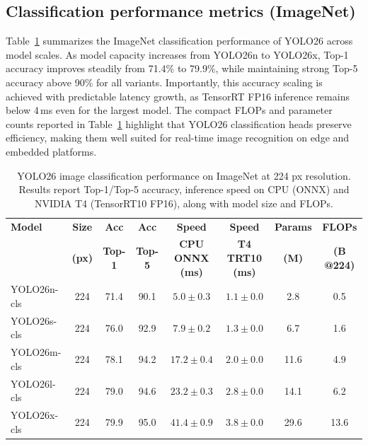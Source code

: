 \documentclass{article}
\begin{document}
\subsection{Classification performance metrics (ImageNet)}

Table~\ref{tab:yolo26_classification} summarizes the ImageNet classification performance of YOLO26 across model scales. As model capacity increases from YOLO26n to YOLO26x, Top-1 accuracy improves steadily from 71.4\% to 79.9\%, while maintaining strong Top-5 accuracy above 90\% for all variants. Importantly, this accuracy scaling is achieved with predictable latency growth, as TensorRT FP16 inference remains below 4\,ms even for the largest model. The compact FLOPs and parameter counts reported in Table~\ref{tab:yolo26_classification} highlight that YOLO26 classification heads preserve efficiency, making them well suited for real-time image recognition on edge and embedded platforms.

\begin{table}[t]
\centering
\scriptsize
\setlength{\tabcolsep}{4pt}
\renewcommand{\arraystretch}{1.15}
\caption{YOLO26 image classification performance on ImageNet at 224 px resolution. Results report Top-1/Top-5 accuracy, inference speed on CPU (ONNX) and NVIDIA T4 (TensorRT10 FP16), along with model size and FLOPs.}
\label{tab:yolo26_classification}
\vspace{2pt}

\begin{tabular}{l c c c c c c c}
\toprule
\textbf{Model} & \textbf{Size} & \textbf{Acc} & \textbf{Acc} & \textbf{Speed} & \textbf{Speed} & \textbf{Params} & \textbf{FLOPs} \\
 & \textbf{(px)} & \textbf{Top-1} & \textbf{Top-5} & \textbf{CPU ONNX (ms)} & \textbf{T4 TRT10 (ms)} & \textbf{(M)} & \textbf{(B @224)} \\
\midrule
YOLO26n-cls & 224 & 71.4 & 90.1 & $5.0 \pm 0.3$ & $1.1 \pm 0.0$ & 2.8 & 0.5 \\
YOLO26s-cls & 224 & 76.0 & 92.9 & $7.9 \pm 0.2$ & $1.3 \pm 0.0$ & 6.7 & 1.6 \\
YOLO26m-cls & 224 & 78.1 & 94.2 & $17.2 \pm 0.4$ & $2.0 \pm 0.0$ & 11.6 & 4.9 \\
YOLO26l-cls & 224 & 79.0 & 94.6 & $23.2 \pm 0.3$ & $2.8 \pm 0.0$ & 14.1 & 6.2 \\
YOLO26x-cls & 224 & 79.9 & 95.0 & $41.4 \pm 0.9$ & $3.8 \pm 0.0$ & 29.6 & 13.6 \\
\bottomrule
\end{tabular}
\end{table}
\end{document}
